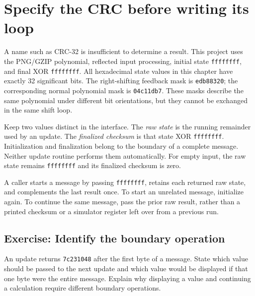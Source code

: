 \section{Specify the CRC before writing its loop}
A name such as CRC-32 is insufficient to determine a result. This project uses the
PNG/GZIP polynomial, reflected input processing, initial state \texttt{ffffffff},
and final XOR \texttt{ffffffff}. All hexadecimal state values in this chapter have
exactly 32 significant bits. The right-shifting feedback mask is
\texttt{edb88320}; the corresponding normal polynomial mask is \texttt{04c11db7}.
These masks describe the same polynomial under different bit orientations, but they
cannot be exchanged in the same shift loop.

Keep two values distinct in the interface. The \emph{raw state} is the running
remainder used by an update. The \emph{finalized checksum} is that state XOR
\texttt{ffffffff}. Initialization and finalization belong to the boundary of a
complete message. Neither update routine performs them automatically. For empty
input, the raw state remains \texttt{ffffffff} and its finalized checksum is zero.

A caller starts a message by passing \texttt{ffffffff}, retains each returned raw
state, and complements the last result once. To start an unrelated message, initialize
again. To continue the same message, pass the prior raw result, rather than a printed
checksum or a simulator register left over from a previous run.

\subsection*{Exercise: Identify the boundary operation}
An update returns \texttt{7c231048} after the first byte of a message. State which
value should be passed to the next update and which value would be displayed if that
one byte were the entire message. Explain why displaying a value and continuing a
calculation require different boundary operations.
